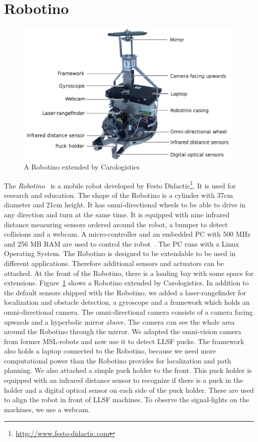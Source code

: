 \section{Robotino}
\label{sec:robotino}
\begin{figure}
\includegraphics[scale=0.11]{pics/carologistics_robotino}
\caption{A Robotino extended by Carologistics}
\label{fig:caro_robotino}
\end{figure}
The \textit{Robotino}~\cite{Robotino} is a mobile robot developed by Festo Didactic\footnote{\url{http://www.festo-didactic.com}}. It is used for research and education. The shape of the Robotino is a cylinder with 37cm diameter and 21cm height. It has omni-directional wheels to be able to drive in any direction and turn at the same time. It is equipped with nine infrared distance measuring sensors ordered around the robot, a bumper to detect collisions and a webcam. A micro-controller and an embedded PC with 500 MHz and 256 MB RAM are used to control the robot~\cite{Incremental}. The PC runs with a Linux Operating System. The Robotino is designed to be extendable to be used in different applications. Therefore additional sensors and actuators can be attached. At the front of the Robotino, there is a loading bay with some space for extensions. Figure~\ref{fig:caro_robotino} shows a Robotino extended by Carologistics. In addition to the default sensors shipped with the Robotino, we added a laser-rangefinder for localization and obstacle detection, a gyroscope and a framework which holds an omni-directional camera. The omni-directional camera consists of a camera facing upwards and a hyperbolic mirror above. The camera can see the whole area around the Robotino through the mirror. We adapted the omni-vision camera from former MSL-robots and now use it to detect LLSF pucks. The framework also holds a laptop connected to the Robotino, because we need more computational power than the Robotino provides for localization and path planning. We also attached a simple puck holder to the front. This puck holder is equipped with an infrared distance sensor to recognize if there is a puck in the holder and a digital optical sensor on each side of the puck holder. These are used to align the robot in front of LLSF machines. To observe the signal-lights on the machines, we use a webcam.\\


